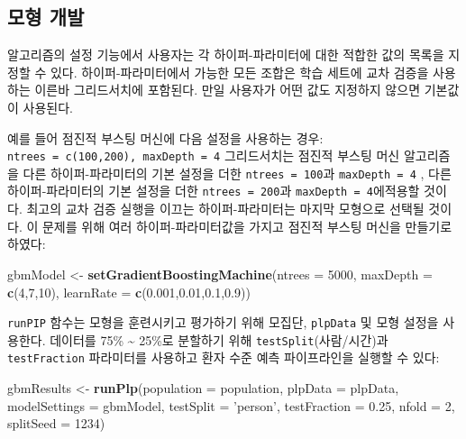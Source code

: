 \documentclass[11pt]{book}
\newenvironment{Shaded}{\begin{snugshade}}{\end{snugshade}}
\newcommand{\KeywordTok}[1]{\textcolor[rgb]{0.13,0.29,0.53}{\textbf{#1}}}
\newcommand{\DataTypeTok}[1]{\textcolor[rgb]{0.13,0.29,0.53}{#1}}
\newcommand{\DecValTok}[1]{\textcolor[rgb]{0.00,0.00,0.81}{#1}}
\newcommand{\FloatTok}[1]{\textcolor[rgb]{0.00,0.00,0.81}{#1}}
\newcommand{\StringTok}[1]{\textcolor[rgb]{0.31,0.60,0.02}{#1}}
\newcommand{\NormalTok}[1]{#1}
\theoremstyle{definition}
\theoremstyle{definition}
\theoremstyle{definition}
\theoremstyle{remark}
\begin{document}
\subsection{모형 개발}\label{-}

알고리즘의 설정 기능에서 사용자는 각 하이퍼-파라미터에 대한 적합한 값의
목록을 지정할 수 있다. 하이퍼-파라미터에서 가능한 모든 조합은 학습
세트에 교차 검증을 사용하는 이른바 그리드서치에 포함된다. 만일 사용자가
어떤 값도 지정하지 않으면 기본값이 사용된다.

예를 들어 점진적 부스팅 머신에 다음 설정을 사용하는 경우:
\texttt{ntrees\ =\ c(100,200),\ maxDepth\ =\ 4} 그리드서치는 점진적
부스팅 머신 알고리즘을 다른 하이퍼-파라미터의 기본 설정을 더한
\texttt{ntrees\ =\ 100}과 \texttt{maxDepth\ =\ 4} , 다른
하이퍼-파라미터의 기본 설정을 더한 \texttt{ntrees\ =\ 200}과
\texttt{maxDepth\ =\ 4}에적용할 것이다. 최고의 교차 검증 실행을 이끄는
하이퍼-파라미터는 마지막 모형으로 선택될 것이다. 이 문제를 위해 여러
하이퍼-파라미터값을 가지고 점진적 부스팅 머신을 만들기로 하였다:

\begin{Shaded}
\begin{Highlighting}[]
\NormalTok{gbmModel <-}\StringTok{ }\KeywordTok{setGradientBoostingMachine}\NormalTok{(}\DataTypeTok{ntrees =} \DecValTok{5000}\NormalTok{, }
                                       \DataTypeTok{maxDepth =} \KeywordTok{c}\NormalTok{(}\DecValTok{4}\NormalTok{,}\DecValTok{7}\NormalTok{,}\DecValTok{10}\NormalTok{), }
                                       \DataTypeTok{learnRate =} \KeywordTok{c}\NormalTok{(}\FloatTok{0.001}\NormalTok{,}\FloatTok{0.01}\NormalTok{,}\FloatTok{0.1}\NormalTok{,}\FloatTok{0.9}\NormalTok{))}
\end{Highlighting}
\end{Shaded}

\texttt{runPIP} 함수는 모형을 훈련시키고 평가하기 위해 모집단,
\texttt{plpData} 및 모형 설정을 사용한다. 데이터를 75\%
\textasciitilde{} 25\%로 분할하기 위해 \texttt{testSplit}(사람/시간)과
\texttt{testFraction} 파라미터를 사용하고 환자 수준 예측 파이프라인을
실행할 수 있다:

\begin{Shaded}
\begin{Highlighting}[]
\NormalTok{gbmResults <-}\StringTok{ }\KeywordTok{runPlp}\NormalTok{(}\DataTypeTok{population =}\NormalTok{ population, }
                     \DataTypeTok{plpData =}\NormalTok{ plpData, }
                     \DataTypeTok{modelSettings =}\NormalTok{ gbmModel, }
                     \DataTypeTok{testSplit =} \StringTok{'person'}\NormalTok{,}
                     \DataTypeTok{testFraction =} \FloatTok{0.25}\NormalTok{, }
                     \DataTypeTok{nfold =} \DecValTok{2}\NormalTok{, }
                     \DataTypeTok{splitSeed =} \DecValTok{1234}\NormalTok{)}
\end{Highlighting}
\end{Shaded}
\end{document}

